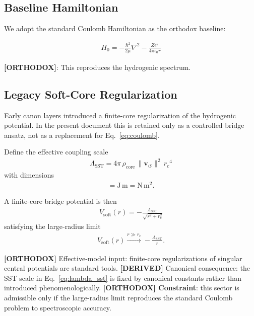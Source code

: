 \documentclass[11pt]{article}
\theoremstyle{definition}
\theoremstyle{plain}
\theoremstyle{remark}
\newcommand{\rhocore}{\rho_{\mathrm{core}}}
\newcommand{\rc}{{r_c}}
\newcommand{\vnorm}{\lVert \mathbf{v}_{\!\boldsymbol{\circlearrowleft}} \rVert}
\begin{document}
    \subsection{Baseline Hamiltonian}
        
        We adopt the standard Coulomb Hamiltonian as the orthodox baseline:
        
        \begin{align}
            H_0 = -\frac{\hbar^2}{2\mu} \nabla^2 - \frac{Ze^2}{4\pi \epsilon_0 r}
            \label{eq:coulomb}
        \end{align}
        
        \textbf{[ORTHODOX]}: This reproduces the hydrogenic spectrum.

    \subsection{Legacy Soft-Core Regularization}

        Early canon layers introduced a finite-core regularization of the hydrogenic potential. In the present document this is retained only as a controlled bridge ansatz, not as a replacement for Eq.~\eqref{eq:coulomb}.

        Define the effective coupling scale
        \begin{align}
            \Lambda_{\mathrm{SST}} = 4\pi \, \rhocore \, \vnorm^{2} \, \rc^{4}
            \label{eq:lambda_sst}
        \end{align}
        with dimensions
        \begin{align}
            [\Lambda_{\mathrm{SST}}] = \mathrm{J\,m} = \mathrm{N\,m^2}.
        \end{align}

        A finite-core bridge potential is then
        \begin{align}
            V_{\mathrm{soft}}(r) = -\frac{\Lambda_{\mathrm{SST}}}{\sqrt{r^2+r_c^2}}
            \label{eq:softcore_potential}
        \end{align}
        satisfying the large-radius limit
        \begin{align}
            V_{\mathrm{soft}}(r) \xrightarrow{r\gg r_c} -\frac{\Lambda_{\mathrm{SST}}}{r}.
        \end{align}

        \textbf{[ORTHODOX]} Effective-model input: finite-core regularizations of singular central potentials are standard tools.\newline
        \textbf{[DERIVED]} Canonical consequence: the SST scale in Eq.~\eqref{eq:lambda_sst} is fixed by canonical constants rather than introduced phenomenologically.\newline
        \textbf{[ORTHODOX] Constraint}: this sector is admissible only if the large-radius limit reproduces the standard Coulomb problem to spectroscopic accuracy.
\end{document}
